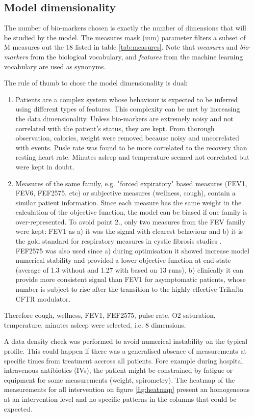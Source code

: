 \subsection{Model dimensionality}
The number of bio-markers chosen is exactly the number of dimensions that will be studied by the model. The measures mask (mm) parameter filters a subset of M measures out the 18 listed in table \ref{tab:measures}. Note that \textit{measures} and \textit{bio-markers} from the biological vocabulary, and \textit{features} from the machine learning vocabulary are used as synonyms.

The rule of thumb to chose the model dimensionality is dual:
\begin{enumerate}
    \item Patients are a complex system whose behaviour is expected to be inferred using different types of features. This complexity can be met by increasing the data dimensionality. Unless bio-markers are extremely noisy and not correlated with the patient's status, they are kept. From thorough observation, calories, weight were removed because noisy and uncorrelated with events. Pusle rate was found to be more correlated to the recovery than resting heart rate. Minutes asleep and temperature seemed not correlated but were kept in doubt.
    \item Measures of the same family, e.g. "forced expiratory" based measures (FEV1, FEV6, FEF2575, etc) or subjective measures (wellness, cough), contain a similar patient information. Since each measure has the same weight in the calculation of the objective function, the model can be biased if one family is over-represented. To avoid point 2., only two measures from the FEV family were kept: FEV1 as a) it was the signal with clearest behaviour and b) it is the gold standard for respiratory measures in cystic fibrosis studies \cite{giron_2021}. FEF2575 was also used since a) during optimisation it showed increase model numerical stability and provided a lower objective function at end-state (average of 1.3 without and 1.27 with based on 13 runs), b) clinically it can provide more consistent signal than FEV1 for asymptomatic patients, whose number is subject to rise after the transition to the highly effective Trikafta CFTR modulator.
\end{enumerate}

Therefore cough, wellness, FEV1, FEF2575, pulse rate, O2 saturation, temperature, minutes asleep were selected, i.e. 8 dimensions.

A data density check was performed to avoid numerical instability on the typical profile. This could happen if there was a generalised absence of measurements at specific times from treatment accross all patients. Fore example during hospital intravenous antibiotics (IVs), the patient might be constrained by fatigue or equipment for some measurements (weight, spirometry). The heatmap of the measurements for all intervention on figure \ref{fig:heatmap} present an homogeneous at an intervention level and no specific patterns in the columns that could be expected.

